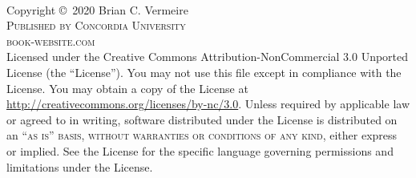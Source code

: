 \documentclass[11pt,fleqn]{book} %
\begin{document}

\begingroup
\thispagestyle{empty} %
\vfill
\endgroup


\begingroup
\newpage
\thispagestyle{empty} %
\vfill
\endgroup



\newpage
~\vfill
\thispagestyle{empty}

\noindent Copyright \copyright\ 2020 Brian C. Vermeire\\ %

\noindent \textsc{Published by Concordia University}\\ %

\noindent \textsc{book-website.com}\\ %

\noindent Licensed under the Creative Commons Attribution-NonCommercial 3.0 Unported License (the ``License''). You may not use this file except in compliance with the License. You may obtain a copy of the License at \url{http://creativecommons.org/licenses/by-nc/3.0}. Unless required by applicable law or agreed to in writing, software distributed under the License is distributed on an \textsc{``as is'' basis, without warranties or conditions of any kind}, either express or implied. See the License for the specific language governing permissions and limitations under the License.\\ %
\end{document}
